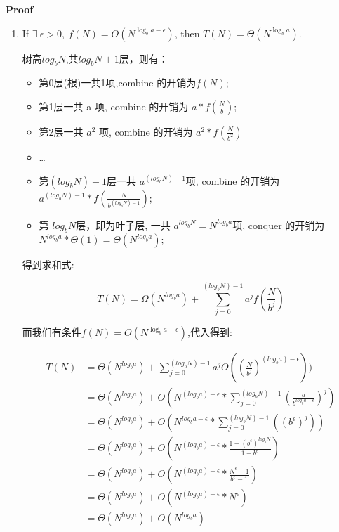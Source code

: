 \documentclass{article}
\begin{document}
\textbf{Proof}\par
\begin{enumerate}
    \item If $\exists\ \epsilon>0,\ f(N)=O(N^{\log_b a-\epsilon})$, then $T(N)=\Theta (N^{\log_b a})$.\par
    树高$log_b N$,共$log_b N + 1$层，则有：\par
    \begin{itemize}
        \item 第0层(根)一共1项,combine 的开销为$f(N)$;
        \item 第1层一共 a 项, combine 的开销为 $a * f(\frac{N}{b})$;
        \item 第2层一共 $a^2$ 项, combine 的开销为 $ a^2 * f(\frac{N}{b^2})$
        \item \dots
        \item 第$(log_b N) - 1$层一共 $a^{(log_b N)-1}$项, combine 的开销为 $a^{(log_b N) - 1} * f(\frac{N}{b^{(log_b N)-1}})$;
        \item 第 $log_b N$层，即为叶子层, 一共 $a^{log_b N} = N^{log_b a}$项, conquer 的开销为 $N^{log_b a} * \Theta(1) = \Theta(N^{log_b a})$;
    \end{itemize}
    得到求和式:\par
    $$T(N) = \Omega (N^{log_b a}) + \sum_{j = 0}^{(log_b N)-1} a^j f(\frac{N}{b^j})$$\par
    而我们有条件$f(N)=O(N^{\log_b a-\epsilon})$,代入得到:\par
    \begin{align*}
        T(N)& = \Theta(N^{log_b a}) + \sum_{j = 0}^{(log_b N) - 1} a^j O((\frac{N}{b^j})^{(log_b a)- \epsilon})) \\
            & = \Theta(N^{log_b a}) + O(N^{(log_b a)-\epsilon} * \sum_{j=0}^{(log_b N )- 1}(\frac{a}{b^{log_b a - \epsilon}})^j) \\
            & = \Theta(N^{log_b a}) + O(N^{log_b a - \epsilon} * \sum_{j = 0}^{(log_b N )- 1}((b^{\epsilon})^j))\\
            & = \Theta(N^{log_b a}) + O(N^{(log_b a) - \epsilon} * \frac{1-(b^\epsilon)^{log_b N}}{1-b^{\epsilon}})\\
            & = \Theta(N^{log_b a}) +O(N^{(log_b a) - \epsilon} * \frac{N^{\epsilon} - 1}{b^{\epsilon} - 1})\\
            & = \Theta(N^{log_b a}) + O(N^{(log_b a) - \epsilon} * N^{\epsilon})\\
            & = \Theta(N^{log_b a}) + O(N^{log_b a})\\

\end{align*}
\end{enumerate}
\end{document}
